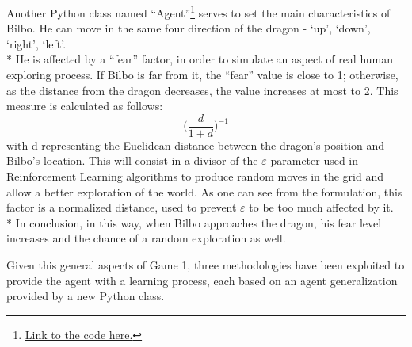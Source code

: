 Another Python class named ``Agent''\footnote{\href{https://github.com/moiraghif/DragonHunting/blob/master/Bilbo\%20World/agents.py}{Link to the code here.}} serves to set the main characteristics of Bilbo.
He can move in the same four direction of the dragon - `up', `down', `right', `left'. \\*
He is affected by a ``fear'' factor, in order to simulate an aspect of real human exploring process. If Bilbo is far from it, the ``fear'' value is close to 1; otherwise, as the distance from the dragon decreases, the value increases at most to 2. This measure is calculated as follows: 
$$\Big(\frac{d}{1+d}\Big)^{-1}$$
with d representing the Euclidean distance between the dragon's position and Bilbo's location.
This will consist in a divisor of the $\varepsilon$ parameter used in Reinforcement Learning algorithms to produce random moves in the grid and allow a better exploration of the world. As one can see from the formulation, this factor is a normalized distance, used to prevent $\varepsilon$ to be too much affected by it.\\*
In conclusion, in this way, when Bilbo approaches the dragon, his fear level increases and the chance of a random exploration as well.

Given this general aspects of Game 1, three methodologies have been exploited to provide the agent with a learning process, each based on an agent generalization provided by a new Python class.

